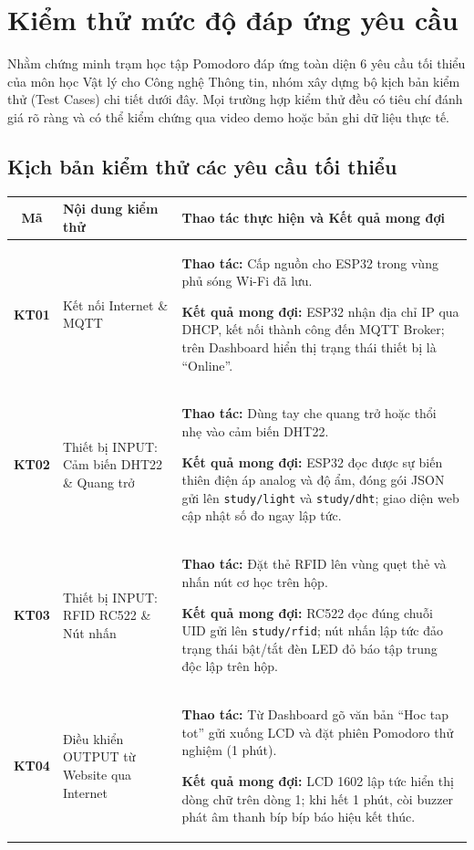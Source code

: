 \section{Kiểm thử mức độ đáp ứng yêu cầu}

Nhằm chứng minh trạm học tập Pomodoro đáp ứng toàn diện 6 yêu cầu tối thiểu của môn học Vật lý cho Công nghệ Thông tin, nhóm xây dựng bộ kịch bản kiểm thử (Test Cases) chi tiết dưới đây. Mọi trường hợp kiểm thử đều có tiêu chí đánh giá rõ ràng và có thể kiểm chứng qua video demo hoặc bản ghi dữ liệu thực tế.

\subsection{Kịch bản kiểm thử các yêu cầu tối thiểu}

\begin{table}[htbp]
\centering
\small
\begin{tabular}{|c|p{3.5cm}|p{9cm}|}
\hline
\textbf{Mã} & \textbf{Nội dung kiểm thử} & \textbf{Thao tác thực hiện và Kết quả mong đợi} \\ \hline
\textbf{KT01} & Kết nối Internet \& MQTT & \textbf{Thao tác:} Cấp nguồn cho ESP32 trong vùng phủ sóng Wi-Fi đã lưu.\par\textbf{Kết quả mong đợi:} ESP32 nhận địa chỉ IP qua DHCP, kết nối thành công đến MQTT Broker; trên Dashboard hiển thị trạng thái thiết bị là ``Online''. \\ \hline

\textbf{KT02} & Thiết bị INPUT: Cảm biến DHT22 \& Quang trở & \textbf{Thao tác:} Dùng tay che quang trở hoặc thổi nhẹ vào cảm biến DHT22.\par\textbf{Kết quả mong đợi:} ESP32 đọc được sự biến thiên điện áp analog và độ ẩm, đóng gói JSON gửi lên \texttt{study/light} và \texttt{study/dht}; giao diện web cập nhật số đo ngay lập tức. \\ \hline

\textbf{KT03} & Thiết bị INPUT: RFID RC522 \& Nút nhấn & \textbf{Thao tác:} Đặt thẻ RFID lên vùng quẹt thẻ và nhấn nút cơ học trên hộp.\par\textbf{Kết quả mong đợi:} RC522 đọc đúng chuỗi UID gửi lên \texttt{study/rfid}; nút nhấn lập tức đảo trạng thái bật/tắt đèn LED đỏ báo tập trung độc lập trên hộp. \\ \hline

\textbf{KT04} & Điều khiển OUTPUT từ Website qua Internet & \textbf{Thao tác:} Từ Dashboard gõ văn bản ``Hoc tap tot'' gửi xuống LCD và đặt phiên Pomodoro thử nghiệm (1 phút).\par\textbf{Kết quả mong đợi:} LCD 1602 lập tức hiển thị dòng chữ trên dòng 1; khi hết 1 phút, còi buzzer phát âm thanh bíp bíp báo hiệu kết thúc. \\ \hline


\end{tabular}
\end{table}
